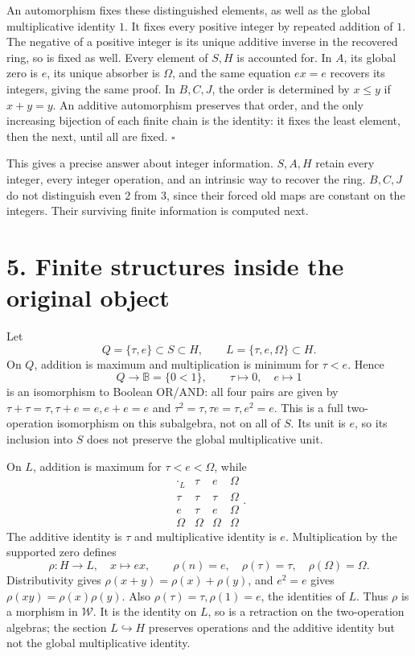 \documentclass[
]{article}
\begin{document}
An automorphism fixes these distinguished elements, as well as the
global multiplicative identity \(1\). It fixes every positive integer by
repeated addition of \(1\). The negative of a positive integer is its
unique additive inverse in the recovered ring, so is fixed as well.
Every element of \(S,H\) is accounted for. In \(A\), its global zero is
\(e\), its unique absorber is \(\Omega\), and the same equation \(ex=e\)
recovers its integers, giving the same proof. In \(B,C,J\), the order is
determined by \(x\le y\) if \(x+y=y\). An additive automorphism
preserves that order, and the only increasing bijection of each finite
chain is the identity: it fixes the least element, then the next, until
all are fixed. \(\square\)

This gives a precise answer about integer information. \(S,A,H\) retain
every integer, every integer operation, and an intrinsic way to recover
the ring. \(B,C,J\) do not distinguish even \(2\) from \(3\), since
their forced old maps are constant on the integers. Their surviving
finite information is computed next.

\section{5. Finite structures inside the original
object}\label{finite-structures-inside-the-original-object}

Let \[
Q=\{\tau,e\}\subset S\subset H,\qquad
L=\{\tau,e,\Omega\}\subset H.
\tag{Z15}
\] On \(Q\), addition is maximum and multiplication is minimum for
\(\tau<e\). Hence \[
Q\longrightarrow\mathbb B=\{0<1\},
\qquad \tau\mapsto0,\quad e\mapsto1
\tag{Z16}
\] is an isomorphism to Boolean OR/AND: all four pairs are given by
\(\tau+\tau=\tau,\tau+e=e,e+e=e\) and \(\tau^2=\tau,\tau e=\tau,e^2=e\).
This is a full two-operation isomorphism on this subalgebra, not on all
of \(S\). Its unit is \(e\), so its inclusion into \(S\) does not
preserve the global multiplicative unit.

On \(L\), addition is maximum for \(\tau<e<\Omega\), while \[
\begin{array}{c|ccc}\cdot_L&\tau&e&\Omega\\\hline
\tau&\tau&\tau&\Omega\\
e&\tau&e&\Omega\\
\Omega&\Omega&\Omega&\Omega
\end{array}.
\tag{Z17}
\] The additive identity is \(\tau\) and multiplicative identity is
\(e\). Multiplication by the supported zero defines \[
\rho:H\to L,\quad x\mapsto ex,
\qquad
\rho(n)=e,\quad\rho(\tau)=\tau,\quad\rho(\Omega)=\Omega.
\tag{Z18}
\] Distributivity gives \(\rho(x+y)=\rho(x)+\rho(y)\), and \(e^2=e\)
gives \(\rho(xy)=\rho(x)\rho(y)\). Also \(\rho(\tau)=\tau,\rho(1)=e\),
the identities of \(L\). Thus \(\rho\) is a morphism in \(\mathcal W\).
It is the identity on \(L\), so is a retraction on the two-operation
algebras; the section \(L\hookrightarrow H\) preserves operations and
the additive identity but not the global multiplicative identity.
\end{document}
